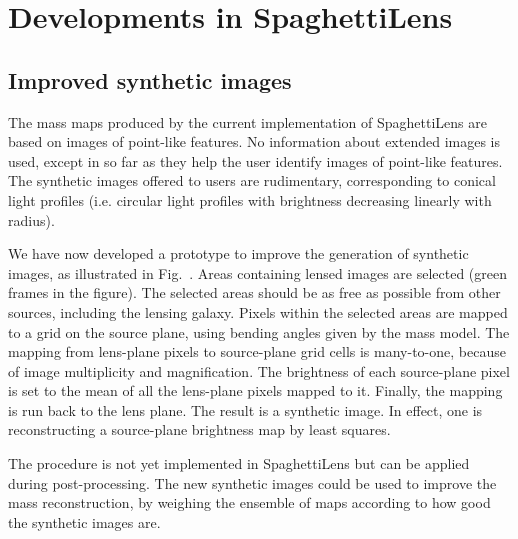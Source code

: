 
\section{Developments in SpaghettiLens}

\subsection{Improved synthetic images}\label{subsec:sourcefit}

The mass maps produced by the current implementation of SpaghettiLens
are based on images of point-like features.  No information about
extended images is used, except in so far as they help the user
identify images of point-like features.  The synthetic images offered
to users are rudimentary, corresponding to conical light profiles
(i.e.  circular light profiles with brightness decreasing linearly
with radius).

We have now developed a prototype to improve the generation of
synthetic images, as illustrated in Fig.~. Areas
containing lensed images are selected (green frames in the figure).
The selected areas should be as free as possible from other
sources, including the lensing galaxy. Pixels within the
selected areas are mapped to a grid on the source plane, using bending
angles given by the mass model.  The mapping from lens-plane pixels to
source-plane grid cells is many-to-one, because of image multiplicity
and magnification.  The brightness of each source-plane pixel is set
to the mean of all the lens-plane pixels mapped to it.  Finally, the
mapping is run back to the lens plane.  The result is a synthetic
image.  In effect, one is reconstructing a source-plane brightness map
by least squares.

The procedure is not yet implemented in SpaghettiLens but can be
applied during post-processing.  The new synthetic images could be used to
improve the mass reconstruction, by weighing the ensemble of maps
according to how good the synthetic images are.

